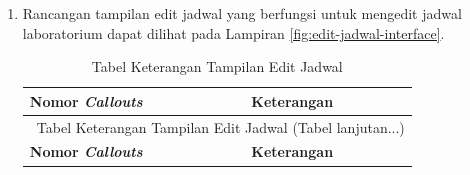 \begin{enumerate}
	\item Rancangan tampilan edit jadwal yang berfungsi untuk mengedit jadwal laboratorium dapat dilihat pada Lampiran \ref{fig:edit-jadwal-interface}.

	      {
	      \fontsize{10}{13}\selectfont
	      \begin{longtable}{p{4cm} p{9cm}}
		      \caption{Tabel Keterangan Tampilan Edit Jadwal}
		      \label{tab:edit-jadwal}                                                                                                                                                                                            \\
		      \hline
		      \textbf{Nomor \textit{Callouts}} & \textbf{Keterangan}                                                                                                                                                             \\
		      \hline
		      \endfirsthead

		      \multicolumn{2}{c}{\selectfont \thetable\ {Tabel Keterangan Tampilan Edit Jadwal} \space (Tabel lanjutan...)}                                                                                                      \\
		      \hline
		      \textbf{Nomor \textit{Callouts}} & \textbf{Keterangan}                                                                                                                                                             \\
		      \hline
		      \endhead


\end{longtable}}
\end{enumerate}
